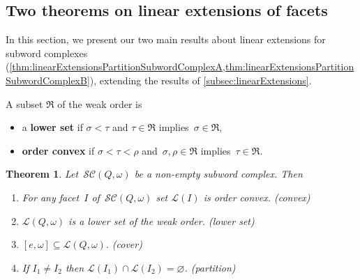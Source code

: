 \documentclass[reqno]{amsart}
\newtheorem{theorem}{Theorem}[section]
\theoremstyle{definition}
\newcommand{\defn}[1]{\textbf{\textsf{\color{PineGreen} #1}}} %
\newcommand{\fR}{\mathfrak{R}} %
\newcommand{\linearExtensions}{\mathcal{L}} %
\newcommand{\subwordComplex}{\mathcal{SC}} %
\begin{document}

\subsection{Two theorems on linear extensions of facets}
\label{subsec:twoTheorems}

In this section, we present our two main results about linear extensions for subword complexes (\cref{thm:linearExtensionsPartitionSubwordComplexA,thm:linearExtensionsPartitionSubwordComplexB}), extending the results of \cref{subsec:linearExtensions}.

A subset $\fR$ of the weak order is 
\begin{itemize}
\item a \defn{lower set} if $\sigma < \tau$ and $\tau \in \fR$ implies~$\sigma \in \fR$,
\item \defn{order convex} if $\sigma < \tau < \rho$ and~$\sigma, \rho \in \fR$ implies~$\tau \in \fR$.
\end{itemize}

\begin{theorem}
\label{thm:linearExtensionsPartitionSubwordComplexA}
Let~$\subwordComplex(Q,\omega)$ be a non-empty subword complex.
Then
\begin{enumerate}
\item For any facet~$I$ of~$\subwordComplex(Q,\omega)$ set $\linearExtensions(I)$ is order convex.
\label{item:convex}
\hfill (convex) 
\item $\linearExtensions(Q,\omega)$ is a lower set of the weak order.
\label{item:lowerSet}
\hfill (lower set)
\item $[e,\omega] \subseteq \linearExtensions(Q,\omega).$
\label{item:cover}
\hfill (cover)
\item If $I_1\neq I_2$ then $\linearExtensions(I_1)\cap \linearExtensions(I_2)=\varnothing$.
\label{item:partition}
\hfill (partition)
\end{enumerate}
\end{theorem}
\end{document}

